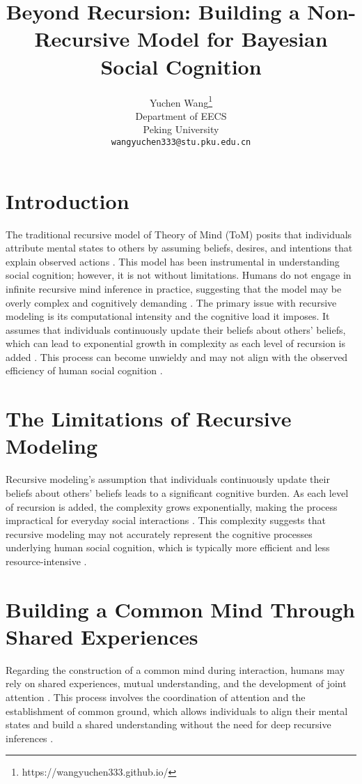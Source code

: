 \documentclass{article}
\title{Beyond Recursion: Building a Non-Recursive Model for Bayesian Social Cognition}
\author{%
  Yuchen Wang\thanks{https://wangyuchen333.github.io/} \\
  Department of EECS\\
  Peking University\\
  \texttt{wangyuchen333@stu.pku.edu.cn} \\
}
\begin{document}
\maketitle

\begin{abstract}

\end{abstract}


\section{Introduction}
The traditional recursive model of Theory of Mind (ToM) posits that individuals attribute mental states to others by assuming beliefs, desires, and intentions that explain observed actions \citep{premack1978does}. This model has been instrumental in understanding social cognition; however, it is not without limitations. Humans do not engage in infinite recursive mind inference in practice, suggesting that the model may be overly complex and cognitively demanding \citep{doshi2020recursively}. The primary issue with recursive modeling is its computational intensity and the cognitive load it imposes. It assumes that individuals continuously update their beliefs about others' beliefs, which can lead to exponential growth in complexity as each level of recursion is added \citep{doshi2020recursively}. This process can become unwieldy and may not align with the observed efficiency of human social cognition \citep{royzman2003know}.

\section{The Limitations of Recursive Modeling}
Recursive modeling's assumption that individuals continuously update their beliefs about others' beliefs leads to a significant cognitive burden. As each level of recursion is added, the complexity grows exponentially, making the process impractical for everyday social interactions \citep{doshi2020recursively}. This complexity suggests that recursive modeling may not accurately represent the cognitive processes underlying human social cognition, which is typically more efficient and less resource-intensive \citep{royzman2003know}.

\section{Building a Common Mind Through Shared Experiences}
Regarding the construction of a common mind during interaction, humans may rely on shared experiences, mutual understanding, and the development of joint attention \citep{Tomasello2018}. This process involves the coordination of attention and the establishment of common ground, which allows individuals to align their mental states and build a shared understanding without the need for deep recursive inferences \citep{Sebanz2003}.
\end{document}
